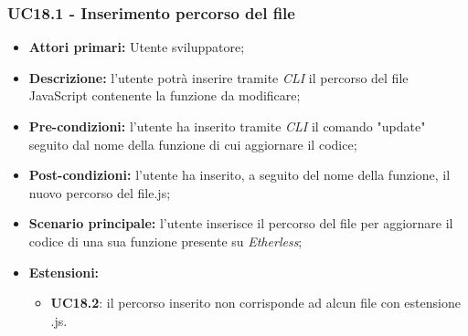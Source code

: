 \subsubsection{UC18.1 - Inserimento percorso del file}
\begin{itemize}
	\item \textbf{Attori primari:} Utente sviluppatore;
	\item \textbf{Descrizione:} l'utente potrà inserire tramite \textit{CLI\glo} il percorso del file JavaScript contenente la funzione da modificare;
	\item \textbf{Pre-condizioni:} l'utente ha inserito tramite \textit{CLI\glo} il comando "update" seguito dal nome della funzione di cui aggiornare il codice;
	\item \textbf{Post-condizioni:} l'utente ha inserito, a seguito del nome della funzione, il nuovo percorso del file.js;
	\item \textbf{Scenario principale:} l'utente inserisce il percorso del file per aggiornare il codice di una sua funzione presente su \textit{Etherless};
	\item \textbf{Estensioni:}
	\begin{itemize}
		\item \textbf{UC18.2}: il percorso inserito non corrisponde ad alcun file con estensione .js.
	\end{itemize}
\end{itemize}
